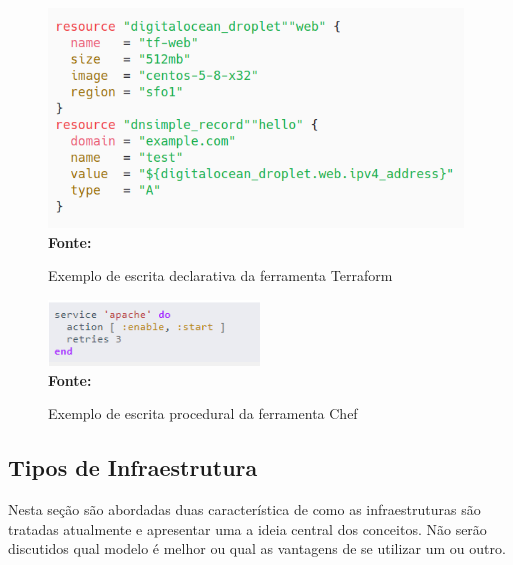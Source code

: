  \begin{figure}[ht]
	\centering	
	\caption[\hspace{0.1cm}Exemplo declarativo]{Exemplo de escrita declarativa da ferramenta Terraform}
	\vspace{-0.4cm}
	\includegraphics[width=0.98\textwidth]{artigo/figuras/terraform-declarative-exemple-01.png}
	 \vspace{-0.2cm}
	\\\textbf{\footnotesize Fonte: \cite{terraform01} }
	\label{fig:figura2}
\end{figure}
\vspace{-0.5cm}
 
\begin{figure}[h]
	\centering	
	\caption[\hspace{0.1cm}Exemplo procedural]{Exemplo de escrita procedural da ferramenta Chef}
	\vspace{-0.4cm}
	\includegraphics[width=0.5\textwidth]{figuras/chef-io-exemplo-procedural.png}
	 \vspace{-0.2cm}
	\\\textbf{\footnotesize Fonte: \cite{chef01}}
	\label{fig:figura1}
\end{figure}
\vspace{-0.5cm}

 \subsection{Tipos de Infraestrutura}
 
 Nesta seção são abordadas duas característica de como as infraestruturas são tratadas atualmente e apresentar uma a ideia central dos conceitos. Não serão discutidos qual modelo é melhor ou qual as vantagens de se utilizar um ou outro. 

